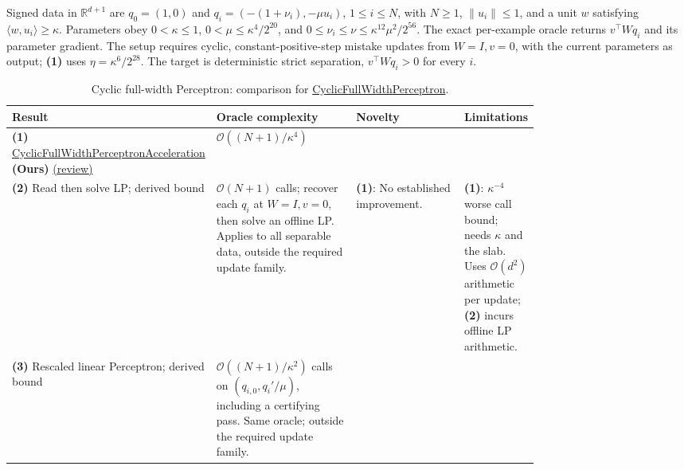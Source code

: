 \begin{table}[tp]
\centering
\caption{Cyclic full-width Perceptron: comparison for \href{https://github.com/k3nfalt/longtails/blob/main/LongTails/Setups/CyclicFullWidthPerceptron.lean}{CyclicFullWidthPerceptron}.}\label{tab:CyclicFullWidthPerceptron}
\parbox{\linewidth}{\footnotesize Signed data in $\mathbb R^{d+1}$ are $q_0=(1,0)$ and $q_i=(-(1+\nu_i),-\mu u_i)$, $1\le i\le N$, with $N\ge1$, $\|u_i\|\le1$, and a unit $w$ satisfying $\langle w,u_i\rangle\ge\kappa$. Parameters obey $0<\kappa\le1$, $0<\mu\le\kappa^4/2^{20}$, and $0\le\nu_i\le\nu\le\kappa^{12}\mu^2/2^{56}$. The exact per-example oracle returns $v^\top Wq_i$ and its parameter gradient. The setup requires cyclic, constant-positive-step mistake updates from $W=I,v=0$, with the current parameters as output; \textbf{(1)} uses $\eta=\kappa^6/2^{28}$. The target is deterministic strict separation, $v^\top Wq_i>0$ for every $i$.}\par\smallskip
\begin{threeparttable}
\footnotesize
\setlength{\tabcolsep}{4pt}\renewcommand{\arraystretch}{1.25}
\begin{tabularx}{\linewidth}{@{}>{\raggedright\arraybackslash}p{0.20\linewidth}>{\raggedright\arraybackslash}p{0.32\linewidth}>{\raggedright\arraybackslash}p{0.25\linewidth}>{\raggedright\arraybackslash}X@{}}
\toprule
\textbf{Result} & \textbf{Oracle complexity} & \textbf{Novelty} & \textbf{Limitations} \\
\midrule
\textbf{(1)} \href{https://github.com/k3nfalt/longtails/blob/main/LongTails/Theorems/CyclicFullWidthPerceptronAcceleration.lean}{Cyclic\allowbreak Full\allowbreak Width\allowbreak Perceptron\allowbreak Acceleration} \textbf{(Ours)} \href{https://github.com/k3nfalt/longtails/blob/main/scripts/reviews/CyclicFullWidthPerceptronAcceleration.md}{(review)}
& $\mathcal O((N+1)/\kappa^4)$ & & \\
\midrule[1.2pt]
\textbf{(2)} Read then solve LP; derived bound \citep{cfwpOracleSource}
& $\mathcal O(N+1)$ calls; recover each $q_i$ at $W=I,v=0$, then solve an offline LP. Applies to all separable data, outside the required update family.
& \textbf{(1)}: No established improvement.
& \textbf{(1)}: $\kappa^{-4}$ worse call bound; needs $\kappa$ and the slab. Uses $\mathcal O(d^2)$ arithmetic per update; \textbf{(2)} incurs offline LP arithmetic. \\
\midrule
\textbf{(3)} Rescaled linear Perceptron; derived bound \citep{cfwpNovikoff1963}
& $\mathcal O((N+1)/\kappa^2)$ calls on $(q_{i,0},q_i'/\mu)$, including a certifying pass. Same oracle; outside the required update family.

\end{tabularx}
\end{threeparttable}
\end{table}
